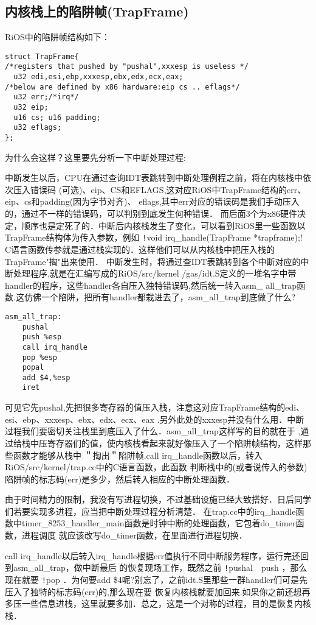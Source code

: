 \subsection{内核栈上的陷阱帧(TrapFrame)}
RiOS中的陷阱帧结构如下：
\begin{verbatim}
struct TrapFrame{
/*registers that pushed by "pushal",xxxesp is useless */	
  u32 edi,esi,ebp,xxxesp,ebx,edx,ecx,eax;
/*below are defined by x86 hardware:eip cs .. eflags*/
  u32 err;/*irq*/
  u32 eip; 
  u16 cs; u16 padding;
  u32 eflags;
};
\end{verbatim}
为什么会这样？这里要先分析一下中断处理过程:

中断发生以后，CPU在通过查询IDT表跳转到中断处理例程之前，将在内核栈中依次压入错误码
(可选)、eip、CS和EFLAGS,这对应RiOS中TrapFrame结构的err、eip、cs和padding(因为字节对齐)、
eflags,其中err对应的错误码是我们手动压入的，通过不一样的错误码，可以判别到底发生何种错误．
而后面3个为x86硬件决定，顺序也是定死了的．中断后内核栈发生了变化，可以看到RiOS里一些函数以
TrapFrame结构体为传入参数，例如
\texttt!void irq_handle(TrapFrame *trapframe);!
C语言函数传参就是通过栈实现的．这样他们可以从内核栈中把压入栈的TrapFrame"掏"出来使用．
中断发生时，将通过查IDT表跳转到各个中断对应的中断处理程序,就是在汇编写成的RiOS/src/kernel
/gas/idt.S定义的一堆名字中带handler的程序，这些handler各自压入独特错误码,然后统一转入asm\_
all\_trap函数.这仿佛一个陷阱，把所有handler都栽进去了，asm\_all\_trap到底做了什么?
\begin{verbatim}
asm_all_trap:
    pushal 
    push %esp
    call irq_handle
    pop %esp
    popal
    add $4,%esp
    iret
\end{verbatim}
可见它先pushal,先把很多寄存器的值压入栈，注意这对应TrapFrame结构的edi、esi、ebp、xxxesp、ebx、edx、ecx、eax
.另外此处的xxxesp并没有什么用．中断过程我们要密切关注栈里到底压入了什么．asm\_all\_trap这样写的目的就在于
,通过给栈中压寄存器们的值，使内核栈看起来就好像压入了一个陷阱帧结构，这样那些函数才能够从栈中
＂掏出＂陷阱帧.call irq\_handle函数以后，转入RiOS/src/kernel/trap.cc中的C语言函数，此函数
判断栈中的(或者说传入的参数)陷阱帧的标志码(err)是多少，然后转入相应的中断处理函数．

由于时间精力的限制，我没有写进程切换，不过基础设施已经大致搭好．日后同学们若要实现多进程，应当把中断处理过程分析清楚．
在trap.cc中的irq\_handle函数中timer\_8253\_handler\_main函数是时钟中断的处理函数，它包着do\_timer函数，进程调度
就应该改写do\_timer函数，在里面进行进程切换．

call irq\_handle以后转入irq\_handle根据err值执行不同中断服务程序，运行完还回到asm\_all\_trap，做中断最后
的恢复现场工作，既然之前
\texttt!pushal　push %
，那么现在就要
\texttt!pop %
．为何要add \$4呢?别忘了，之前idt.S里那些一群handler们可是先压入了独特的标志码(err)的,那么现在要
恢复内核栈就要加回来.如果你之前还想再多压一些信息进栈，这里就要多加．总之，这是一个对称的过程，目的是恢复内核栈．

